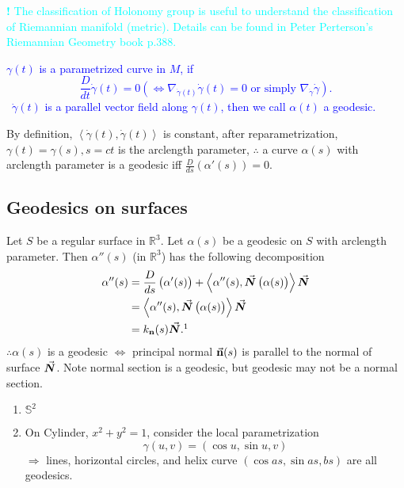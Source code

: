 \textcolor{cyan}{
    {\Large \textbf{!}} The classification of Holonomy group is useful 
    to understand the classification of Riemannian manifold (metric). 
    Details can be found in Peter Perterson's Riemannian Geometry
    book p.388.
}
\textcolor{blue}{
    \begin{definition}[Geodesics]
        \(\gamma(t)\) is a parametrized curve in \(M\), if
        \[
            \frac{D}{dt}\dot{\gamma}(t)=0\left(\Longleftrightarrow
            \nabla_{\dot{\gamma}(t)}\dot{\gamma}(t)=0
            \text{ or simply }\nabla_{\dot{\gamma}}\dot{\gamma}\right).    
        \]
        \ie\ \(\dot{\gamma}(t)\) is a parallel vector field along
        \(\gamma(t)\), then we call \(\alpha(t)\) a geodesic. 
    \end{definition}
}
\begin{remark}
    By definition, \(\left\langle\dot{\gamma}(t),\dot{\gamma}(t)
    \right\rangle\) is constant, after reparametrization,
    \(\gamma(t)=\gamma(s),s=ct\) is the arclength parameter,
    \(\therefore\) a curve \(\alpha(s)\) with arclength parameter
    is a geodesic iff \(\frac{D}{ds}\left(\alpha'(s)\right)=0\).
\end{remark}
\subsection*{Geodesics on surfaces}
Let \(S\) be a regular surface in \(\mathbb{R}^3\). Let \(\alpha(s)\)
be a geodesic on \(S\) with arclength parameter. Then \(\alpha''(s)\)
(in \(\mathbb{R}^3\)) has the following decomposition
\begin{align*}
    \alpha''(s)&=\frac{D}{ds}\left(\alpha'(s)\right)+
    \left\langle\alpha''(s),\va*{N}\left(\alpha(s)\right)\right\rangle
    \va*{N}\\
    &=\left\langle\alpha''(s),\va*{N}\left(\alpha(s)\right)\right\rangle
    \va*{N}\\
    &=k_{\vb{n}}(s)\va*{N}.\footnotemark
\end{align*}
\(\therefore \alpha(s)\) is a geodesic \(\Longleftrightarrow\) principal
normal \(\va{n}(s)\) is parallel to the normal of surface \(\va*{N}\).
Note normal section is a geodesic, but geodesic may not be a normal
section.
\begin{enumerate}[(1)]
    \item \(\mathbb{S}^2\)
    \item On Cylinder, \(x^2+y^2=1\), consider the local parametrization
    \[\gamma(u,v)=\left(\cos u ,\sin u,v\right)\]
    \(\Rightarrow\) lines, horizontal circles, and helix curve
    \(\left(\cos as,\sin as, bs\right)\) are all geodesics.
\end{enumerate}